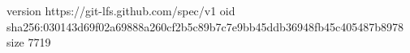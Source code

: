 version https://git-lfs.github.com/spec/v1
oid sha256:030143d69f02a69888a260cf2b5c89b7c7e9bb45ddb36948fb45c405487b8978
size 7719

